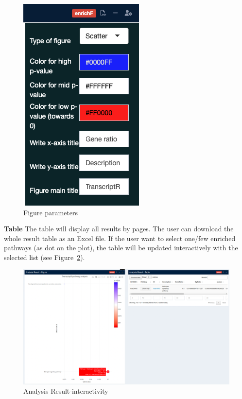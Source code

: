 \documentclass[
  a4paper,
  oneside,
  open=any]{scrreport}
\begin{document}
\begin{figure}[H]

{\centering \includegraphics{./images/pathway/path1-1.png}

}

\caption{\label{fig-path11}Figure parameters}

\end{figure}

\textbf{Table} The table will display all results by pages. The user can
download the whole result table as an Excel file. If the user want to
select one/few enriched pathways (as dot on the plot), the table will be
updated interactively with the selected list (see
Figure~\ref{fig-path12}).

\begin{figure}[H]

{\centering \includegraphics{./images/pathway/path1-2.png}

}

\caption{\label{fig-path12}Analysis Result-interactivity}

\end{figure}
\end{document}
